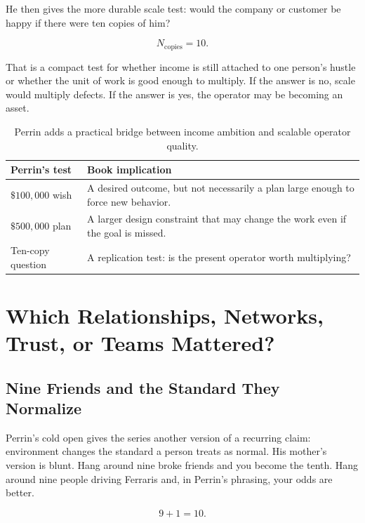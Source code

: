 \documentclass[11pt,oneside]{book}
\begin{document}
He then gives the more durable scale test: would the company or customer be happy if there were ten copies of him?

\begin{equation}
N_{\mathrm{copies}}=10.
\end{equation}

That is a compact test for whether income is still attached to one person's hustle or whether the unit of work is good enough to multiply. If the answer is no, scale would multiply defects. If the answer is yes, the operator may be becoming an asset.

\begin{table}
\centering
\begin{tabular}{|p{.40\linewidth}|p{.46\linewidth}|}
\hline
\textbf{Perrin's test} & \textbf{Book implication} \\
\hline
\(\$100{,}000\) wish & A desired outcome, but not necessarily a plan large enough to force new behavior. \\
\hline
\(\$500{,}000\) plan & A larger design constraint that may change the work even if the goal is missed. \\
\hline
Ten-copy question & A replication test: is the present operator worth multiplying? \\
\hline
\end{tabular}
\caption{Perrin adds a practical bridge between income ambition and scalable operator quality.}
\end{table}

\chapter{Which Relationships, Networks, Trust, or Teams Mattered?}

\section{Nine Friends and the Standard They Normalize}

Perrin's cold open gives the series another version of a recurring claim: environment changes the standard a person treats as normal. His mother's version is blunt. Hang around nine broke friends and you become the tenth. Hang around nine people driving Ferraris and, in Perrin's phrasing, your odds are better.

\begin{equation}
9+1=10.
\end{equation}
\end{document}

